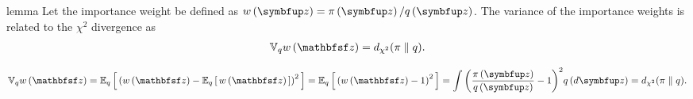 
\begin{theoremEnd}{lemma}\label{thm:iw_variance}
  Let the importance weight be defined as \(w\left(\vz\right) = \pi\left(\vz\right)/q\left(\vz\right)\).
  The variance of the importance weights is related to the \(\chi^2\) divergence as
  \begin{align*}
    \mathbb{V}_{q}{w\left(\rvvz\right)}
    =
    \DChi{\pi}{q}.
  \end{align*}
\end{theoremEnd}
\begin{proofEnd}
  {
  \begin{alignat}{2}
    \mathbb{V}_{q}{w\left(\rvvz\right)}
    =
    \Esub{q}{
      {\left(
        w\left(\rvvz\right)
      -
      \Esub{q}{
        w\left(\rvvz\right)
      }
      \right)}^2
    }
    =
    \Esub{q}{
      {\left(
      w\left(\rvvz\right)
      -
      1
      \right)}^2
    }
    =
    \int {\left( \frac{\pi\left(\vz\right)}{q\left(\vz\right)}  - 1 \right)}^2 q\left(d\vz\right)
    =
    \DChi{\pi}{q}.
    \nonumber
  \end{alignat}
  }
\end{proofEnd}

